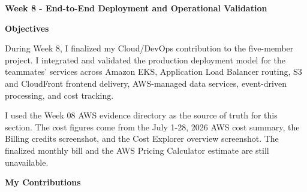 \vspace{0.5em}\noindent\textbf{Week 8 - End-to-End Deployment and Operational
Validation}\par

\vspace{0.5em}\noindent\textbf{Objectives}\par

During Week 8, I finalized my Cloud/DevOps contribution to the
five-member project. I integrated and validated the production
deployment model for the teammates' services across Amazon EKS,
Application Load Balancer routing, S3 and CloudFront frontend delivery,
AWS-managed data services, event-driven processing, and cost tracking.

I used the Week 08 AWS evidence directory as the source of truth for
this section. The cost figures come from the July 1-28, 2026 AWS cost
summary, the Billing credits screenshot, and the Cost Explorer overview
screenshot. The finalized monthly bill and the AWS Pricing Calculator
estimate are still unavailable.

\vspace{0.5em}\noindent\textbf{My Contributions}\par


